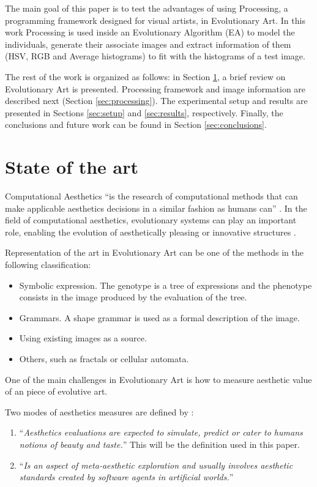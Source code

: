 \documentclass[conference]{IEEEtran}
\begin{document}
The main goal of this paper is to test the advantages of using Processing, a programming framework designed for visual artists, in Evolutionary Art. In this work Processing is used inside an Evolutionary Algorithm (EA) to model the individuals, generate their associate images and extract information of them (HSV, RGB and Average histograms) to fit with the histograms of a test image.

The rest of the work is organized as follows: in Section \ref{sec:soa}, a brief review on Evolutionary Art is presented. Processing framework and image information are described next (Section \ref{sec:processing}). The experimental setup and results are presented in Sections \ref{sec:setup} and \ref{sec:results}, respectively. Finally, the conclusions and future work can be found in Section \ref{sec:conclusions}.

\section{State of the art}
\label{sec:soa}

Computational Aesthetics ``is the research of computational methods that can make applicable aesthetics decisions in a similar fashion as humans can'' \cite{COMPAESTH}. In the field of computational aesthetics, evolutionary systems can play an important role, enabling the evolution of aesthetically pleasing or innovative structures \cite{dipaola2009incorporating}.


Representation of the art in Evolutionary Art can be one of the methods in the following classification:
\begin{itemize}
	\item Symbolic expression. The genotype is a tree of expressions and the phenotype consists in the image produced  by the evaluation of the tree.
	\item Grammars. A shape grammar is used as a formal description of the image.
	\item Using existing images as a source. 
	\item Others, such as fractals or cellular automata.
\end{itemize}

One of the main challenges in Evolutionary Art is how to measure aesthetic value of an piece of evolutive art.

Two modes of aesthetics measures are defined by \cite{galanter2012computational}: 
\begin{enumerate}
\item ``{\em Aesthetics evaluations are expected to simulate, predict or cater to humans notions of beauty and taste.}'' This will be the definition used in this paper. 
\item ``{\em Is an aspect of meta-aesthetic exploration and usually involves aesthetic standards created by software agents in artificial worlds.}''
\end{enumerate}
\end{document}
